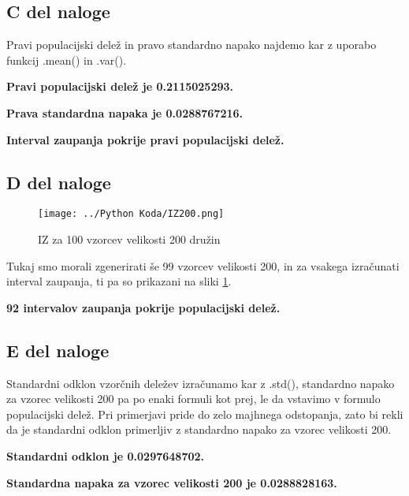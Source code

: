 \documentclass{article}
\begin{document}
    \subsection{C del naloge}
    Pravi populacijski delež in pravo standardno napako najdemo kar z uporabo funkcij .mean() in .var().
    \par \textbf{Pravi populacijski delež je 0.2115025293.}
    \par \textbf{Prava standardna napaka je 0.0288767216.}
    \par \textbf{Interval zaupanja pokrije pravi populacijski delež.}

    \subsection{D del naloge}
    \begin{figure}[H]
        \begin{center}
            \texttt{[image: ../Python Koda/IZ200.png]}
            \caption{IZ za 100 vzorcev velikosti 200 družin}
            \label{200}
        \end{center} 
    \end{figure}
    Tukaj smo morali zgenerirati še 99 vzorcev velikosti 200, in za vsakega izračunati interval zaupanja, ti pa so prikazani na sliki \ref{200}.
    \par \textbf{92 intervalov zaupanja pokrije populacijski delež.}

    \subsection{E del naloge}
    Standardni odklon vzorčnih deležev izračunamo kar z .std(), standardno napako za vzorec velikosti 200 pa po enaki formuli kot prej, le da vstavimo v formulo populacijski delež.
    Pri primerjavi pride do zelo majhnega odstopanja, zato bi rekli da je standardni odklon primerljiv z standardno napako za vzorec velikosti 200.
    \par \textbf{Standardni odklon je 0.0297648702.}
    \par \textbf{Standardna napaka za vzorec velikosti 200 je 0.0288828163.}
\end{document}
